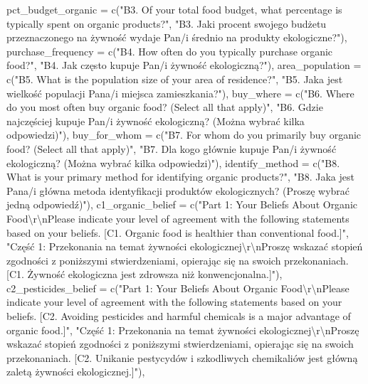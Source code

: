 \documentclass[
  letterpaper,
  DIV=11,
  numbers=noendperiod]{scrartcl}
\newenvironment{Shaded}{\begin{snugshade}}{\end{snugshade}}
\newcommand{\AttributeTok}[1]{\textcolor[rgb]{0.40,0.45,0.13}{#1}}
\newcommand{\FunctionTok}[1]{\textcolor[rgb]{0.28,0.35,0.67}{#1}}
\newcommand{\NormalTok}[1]{\textcolor[rgb]{0.00,0.23,0.31}{#1}}
\newcommand{\SpecialCharTok}[1]{\textcolor[rgb]{0.37,0.37,0.37}{#1}}
\newcommand{\StringTok}[1]{\textcolor[rgb]{0.13,0.47,0.30}{#1}}
\begin{document}
\begin{Shaded}
\begin{Highlighting}[]
  \AttributeTok{pct\_budget\_organic =} \FunctionTok{c}\NormalTok{(}\StringTok{"B3. Of your total food budget, what percentage is typically spent on organic products?"}\NormalTok{, }\StringTok{"B3. Jaki procent swojego budżetu przeznaczonego na żywność wydaje Pan/i średnio na produkty ekologiczne?"}\NormalTok{),}
  \AttributeTok{purchase\_frequency =} \FunctionTok{c}\NormalTok{(}\StringTok{"B4. How often do you typically purchase organic food?"}\NormalTok{, }\StringTok{"B4. Jak często kupuje Pan/i żywność ekologiczną?"}\NormalTok{),}
  \AttributeTok{area\_population =} \FunctionTok{c}\NormalTok{(}\StringTok{"B5. What is the population size of your area of residence?"}\NormalTok{, }\StringTok{"B5. Jaka jest wielkość populacji Pana/i miejsca zamieszkania?"}\NormalTok{),}
  \AttributeTok{buy\_where =} \FunctionTok{c}\NormalTok{(}\StringTok{"B6. Where do you most often buy organic food? (Select all that apply)"}\NormalTok{, }\StringTok{"B6. Gdzie najczęściej kupuje Pan/i żywność ekologiczną? (Można wybrać kilka odpowiedzi)"}\NormalTok{),}
  \AttributeTok{buy\_for\_whom =} \FunctionTok{c}\NormalTok{(}\StringTok{"B7. For whom do you primarily buy organic food? (Select all that apply)"}\NormalTok{, }\StringTok{"B7. Dla kogo głównie kupuje Pan/i żywność ekologiczną? (Można wybrać kilka odpowiedzi)"}\NormalTok{),}
  \AttributeTok{identify\_method =} \FunctionTok{c}\NormalTok{(}\StringTok{"B8. What is your primary method for identifying organic products?"}\NormalTok{, }\StringTok{"B8. Jaka jest Pana/i główna metoda identyfikacji produktów ekologicznych? (Proszę wybrać jedną odpowiedź)"}\NormalTok{),}
  \AttributeTok{c1\_organic\_belief =} \FunctionTok{c}\NormalTok{(}\StringTok{"Part 1: Your Beliefs About Organic Food}\SpecialCharTok{\textbackslash{}r\textbackslash{}n}\StringTok{Please indicate your level of agreement with the following statements based on your beliefs. [C1. Organic food is healthier than conventional food.]"}\NormalTok{, }\StringTok{"Część 1: Przekonania na temat żywności ekologicznej}\SpecialCharTok{\textbackslash{}r\textbackslash{}n}\StringTok{Proszę wskazać stopień zgodności z poniższymi stwierdzeniami, opierając się na swoich przekonaniach. [C1. Żywność ekologiczna jest zdrowsza niż konwencjonalna.]"}\NormalTok{),}
  \AttributeTok{c2\_pesticides\_belief  =} \FunctionTok{c}\NormalTok{(}\StringTok{"Part 1: Your Beliefs About Organic Food}\SpecialCharTok{\textbackslash{}r\textbackslash{}n}\StringTok{Please indicate your level of agreement with the following statements based on your beliefs. [C2. Avoiding pesticides and harmful chemicals is a major advantage of organic food.]"}\NormalTok{, }\StringTok{"Część 1: Przekonania na temat żywności ekologicznej}\SpecialCharTok{\textbackslash{}r\textbackslash{}n}\StringTok{Proszę wskazać stopień zgodności z poniższymi stwierdzeniami, opierając się na swoich przekonaniach. [C2. Unikanie pestycydów i szkodliwych chemikaliów jest główną zaletą żywności ekologicznej.]"}\NormalTok{),}

\end{Highlighting}
\end{Shaded}
\end{document}
